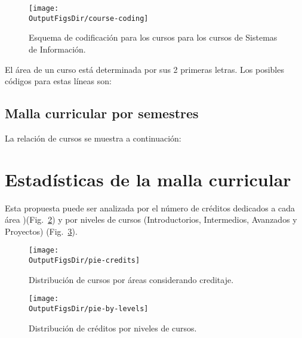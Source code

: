 \begin{figure}[ht]
   \centering
      \texttt{[image: \\OutputFigsDir/course-coding]} 
   \caption{Esquema de codificación para los cursos para los cursos de Sistemas de Información.}
   \label{fig:cs-course-number}
\end{figure}

El área de un curso está determinada por sus 2 primeras letras. 
Los posibles códigos para estas líneas son:
% 

\begin{landscape}
\section{Malla curricular por semestres}\label{sec:courses-by-semester}
La relación de cursos se muestra a continuación:
%

\end{landscape}

\section{Estadísticas de la malla curricular}
Esta propuesta puede ser analizada por el número de créditos dedicados a cada área )(Fig.~\ref{fig:pie-credits}) %
y por niveles de cursos (Introductorios, Intermedios, Avanzados y Proyectos) (Fig.~\ref{fig:pie-by-levels}).

\vspace{0.5cm}
\begin{figure}[h!]
      \centering
      \texttt{[image: \\OutputFigsDir/pie-credits]}
      \label{fig:pie-credits}
      \caption{Distribución de cursos por áreas considerando creditaje.}
\end{figure}

\begin{figure}[h!]
      \centering
      \texttt{[image: \\OutputFigsDir/pie-by-levels]}
      \label{fig:pie-by-levels}
      \caption{Distribución de créditos por niveles de cursos.}
\end{figure}

